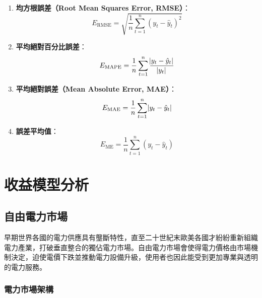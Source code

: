 \begin{enumerate}
  \item \textbf{均方根誤差（Root Mean Squares Error, RMSE）}：
    \begin{equation} \label{equation: RMSE}
      E_{\text{RMSE}} = \sqrt{\frac{1}{n} \sum_{t = 1}^{n} (y_t - \hat{y}_t)^2}
    \end{equation}
  \item \textbf{平均絕對百分比誤差}：
    \begin{equation} \label{equation: MAPE}
      E_{\text{MAPE}} = \frac{1}{n} \sum_{t = 1}^{n} \frac{\abs{y_t - \hat{y}_t}}{\abs{y_t}}
    \end{equation}
  \item \textbf{平均絕對誤差（Mean Absolute Error, MAE）}：
    \begin{equation} \label{equation: MAE}
      E_{\text{MAE}} = \frac{1}{n} \sum_{t = 1}^{n} \abs{y_t - \hat{y}_t}
    \end{equation}
  \item \textbf{誤差平均值}：
    \begin{equation} \label{equation: ME}
      E_{\text{ME}} = \frac{1}{n} \sum_{t = 1}^{n} (y_t - \hat{y}_t)
    \end{equation}
\end{enumerate}

\section{收益模型分析}

\subsection{自由電力市場}

早期世界各國的電力供應具有壟斷特性，直至二十世紀末歐美各國才紛紛重新組織電力產業，打破垂直整合的獨佔電力市場。自由電力市場會使得電力價格由市場機制決定，迫使電價下跌並推動電力設備升級，使用者也因此能受到更加專業與透明的電力服務。

\subsubsection{電力市場架構}

